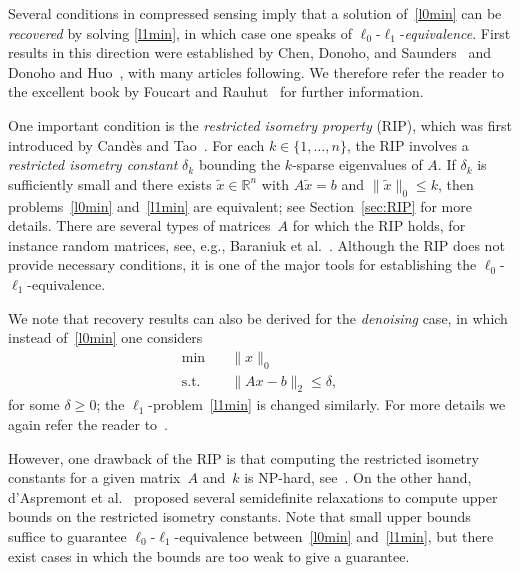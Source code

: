 \documentclass[journal]{IEEEtran}
\newcommand{\Norm}[2]{\lVert{#1}\rVert_{#2}}
\newcommand{\R}{\mathds{R}}
\begin{document}
%


Several conditions in compressed sensing imply that a solution
of~\eqref{l0min} can be \emph{recovered} by solving \eqref{l1min}, in which
case one speaks of $\ell_0$-$\ell_1$-\emph{equivalence}. First results in
this direction were established by Chen, Donoho, and
Saunders~\cite{CheDS99} and Donoho and Huo~\cite{DH01}, with many articles
following. We therefore refer the reader to the excellent book by Foucart
and Rauhut~\cite{FouR13} for further information.

One important condition is the \emph{restricted isometry property} (RIP),
which was first introduced by Cand\`es and Tao~\cite{CT05}. For each $k \in
\{1, \dots, n\}$, the RIP involves a \emph{restricted isometry constant}
$\delta_k$ bounding the $k$-sparse eigenvalues of $A$. If $\delta_k$ is sufficiently small
and there exists $\tilde{x} \in \R^n$ with $A \tilde{x} = b$ and
$\Norm{\tilde{x}}{0} \leq k$, then problems~\eqref{l0min} and~\eqref{l1min}
are equivalent; see Section~\ref{sec:RIP} for more details. There are
several types of matrices~$A$ for which the RIP holds, for instance random
matrices, see, e.g., Baraniuk et al.~\cite{BDDW08}. Although the RIP does
not provide necessary conditions, it is one of the major tools for
establishing the $\ell_0$-$\ell_1$-equivalence.

We note that recovery results can also be derived for the \emph{denoising}
case, in which instead of~\eqref{l0min} one considers
\begin{align}\label{l0minDenoising}
  \min \quad & \Norm{x}{0} \tag{$P_0^\delta$}\\
  \text{s.t.} \quad & \Norm{Ax - b}{2} \leq \delta, \nonumber
\end{align}
for some $\delta \geq 0$; the $\ell_1$-problem~\eqref{l1min} is changed
similarly. For more details we again refer the reader to~\cite{FouR13}.

However, one drawback of the RIP is that computing the restricted isometry
constants for a given matrix~$A$ and~$k$ is NP-hard, see~\cite{PT14}. On
the other hand, d'Aspremont et al.~\cite{Asp07,Asp08} proposed several
semidefinite relaxations to compute upper bounds on the restricted isometry
constants. Note that small upper bounds suffice to guarantee
$\ell_0$-$\ell_1$-equivalence between~\eqref{l0min} and~\eqref{l1min}, but
there exist cases in which the bounds are too weak to give a guarantee.
\end{document}

